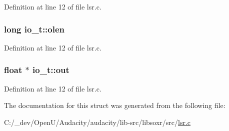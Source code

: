 Definition at line 12 of file lsr.\+c.

\subsubsection[{\texorpdfstring{olen}{olen}}]{\setlength{\rightskip}{0pt plus 5cm}long io\+\_\+t\+::olen}\hypertarget{structio__t_ada97da468f87f6edf29b5e74851f6ec1}{}\label{structio__t_ada97da468f87f6edf29b5e74851f6ec1}


Definition at line 12 of file lsr.\+c.

\subsubsection[{\texorpdfstring{out}{out}}]{\setlength{\rightskip}{0pt plus 5cm}float $\ast$ io\+\_\+t\+::out}\hypertarget{structio__t_a7b0d24f27a02a9463729fd249a7cde92}{}\label{structio__t_a7b0d24f27a02a9463729fd249a7cde92}


Definition at line 12 of file lsr.\+c.



The documentation for this struct was generated from the following file\+:\begin{DoxyCompactItemize}
\item 
C\+:/\+\_\+dev/\+Open\+U/\+Audacity/audacity/lib-\/src/libsoxr/src/\hyperlink{lsr_8c}{lsr.\+c}\end{DoxyCompactItemize}
